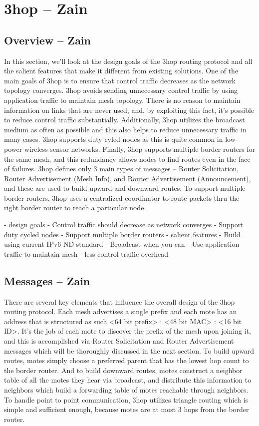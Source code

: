 \section{3hop -- Zain}

\subsection{Overview -- Zain}
In this section, we'll look at the design goals of the 3hop routing protocol and all the salient features that make it different from existing solutions. 
One of the main goals of 3hop is to ensure that control traffic decreases as the network topology converges. 
3hop avoids sending unnecessary control traffic by using application traffic to maintain mesh topology. 
There is no reason to maintain information on links that are never used, and, by exploiting this fact, it's possible to reduce control traffic substantially. 
Additionally, 3hop utilizes the broadcast medium as often as possible and this also helps to reduce unnecessary traffic in many cases.
3hop supports duty cyled nodes as this is quite common in low-power wireless sensor networks.
Finally, 3hop supports multiple border routers for the same mesh, and this redundancy allows nodes to find routes even in the face of failures.
3hop defines only 3 main types of messages -- Router Solicitation, Router Advertisement (Mesh Info), and Router Advertisement (Announcement), and these are used to build upward and downward routes.
To support multiple border routers, 3hop uses a centralized coordinator to route packets thru the right border router to reach a particular node.

- design goals
    - Control traffic should decrease as network converges
    - Support duty cycled nodes
    - Support multiple border routers
- salient features
    - Build using current IPv6 ND standard
    - Broadcast when you can
    - Use application traffic to maintain mesh
    - less control traffic overhead
\fi

\subsection{Messages -- Zain}
There are several key elements that influence the overall design of the 3hop routing protocol.
Each mesh advertises a single prefix and each mote has an address that is structured as such <64 bit prefix> : <48 bit MAC> : <16 bit ID>.
It's the job of each mote to discover the prefix of the mesh upon joining it, and this is accomplished via Router Solicitation and Router Advertisement messages which will be thoroughly discussed in the next section.
To build upward routes, motes simply choose a preferred parent that has the lowest hop count to the border router.
And to build downward routes, motes construct a neighbor table of all the motes they hear via broadcast, and distribute this information to neighbors which build a forwarding table of motes reachable through neighbors.
To handle point to point communication, 3hop utilizes triangle routing which is simple and sufficient enough, because motes are at most 3 hops from the border router.


